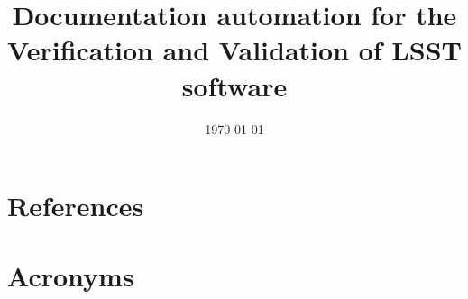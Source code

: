 \documentclass[]{spie}
\begin{document}

\date{\today}
\title{Documentation automation for the Verification and Validation of LSST software}

\maketitle




\appendix

\section{References} \label{sec:bib}
%



\section{Acronyms} \label{sec:acronyms}

\end{document}
